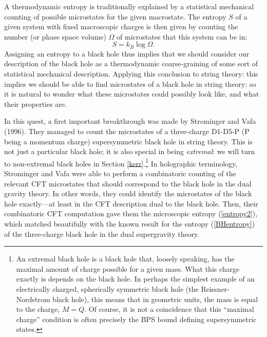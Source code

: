 \documentclass[12pt]{article}
\def\be{\begin{equation}}
\def\ee{\end{equation}}
\renewcommand{\^}[1]{\hat{#1}}
\newcommand{\eq}[1]{(\ref{#1})}
\begin{document}
A thermodynamic entropy is traditionally explained by a statistical mechanical counting of possible microstates for the given macrostate. The entropy $S$ of a given system with fixed macroscopic charges
is then  given by counting the number (or phase space volume) $\Omega$ of microstates that this system can be in:                                                                                                                               
\be \label{entropy2} S = k_B \log \Omega.\ee                                                                                                                    
Assigning an entropy to a black hole thus implies that we should consider our description of the black hole as a thermodynamic coarse-graining of some sort of statistical mechanical description. Applying this conclusion to string theory: this implies we should be able to find microstates of a black hole in string theory: so it is natural to wonder what these microstates could possibly look like, and what their properties are.

In this quest, a first important breakthrough was made by Strominger and Vafa (1996). They managed to count the microstates of a  three-charge D1-D5-P (P being a momentum charge) supersymmetric black hole in string theory.
This is not just a particular black hole; it is also special in being {\em extremal}: we will turn to non-extremal black holes in Section \ref{kerr}.\footnote{An extremal black hole is a black hole that, loosely speaking, has the maximal amount of charge possible for a given mass. What this charge exactly is depends on the black hole. In perhaps the simplest example of an electrically charged, spherically symmetric black hole (the Reissner-Nordstrom black hole), this means that in geometric units, the mass is equal to the charge, $M=Q$. Of course, it is not a coincidence that this ``maximal charge'' condition is often precisely the BPS bound defining supersymmetric states.}
In holographic terminology, Strominger and Vafa were able to perform a combinatoric counting of the relevant CFT microstates that should correspond to the black hole in the dual gravity theory. In other words, they could identify the microstates of the black hole exactly---at least in the CFT description dual to the black hole. Then, their combinatoric CFT computation gave them the microscopic entropy (\ref{entropy2}), which matched beautifully with the known result for the entropy (\ref{BHentropy}) of the three-charge black hole in the dual supergravity theory.
\end{document}
